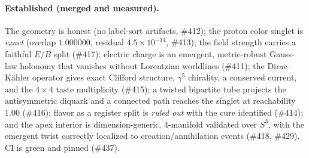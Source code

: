 \documentclass[11pt]{article}
\theoremstyle{definition}
\begin{document}
\paragraph{Established (merged and measured).} The geometry is honest (no label-sort
artifacts, \#412); the proton color singlet is \emph{exact} (overlap $1.000000$, residual
$4.5\times10^{-14}$, \#413); the field strength carries a faithful $E/B$ split (\#417);
electric charge is an emergent, metric-robust Gauss-law holonomy that vanishes without
Lorentzian worldlines (\#411); the Dirac--K\"ahler operator gives exact Clifford structure,
$\gamma^5$ chirality, a conserved current, and the $4\times4$ taste multiplicity (\#415);
a twisted bipartite tube projects the antisymmetric diquark and a connected path reaches
the singlet at reachability $1.00$ (\#416); flavor as a register split is \emph{ruled out}
with the cure identified (\#414); and the apex interior is dimension-generic, $4$-manifold
validated over $S^3$, with the emergent twist correctly localized to
creation/annihilation events (\#418, \#429). CI is green and pinned (\#437).
\end{document}
